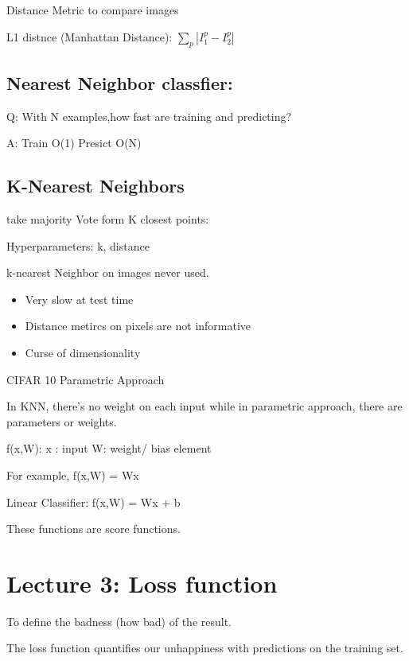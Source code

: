 \documentclass[11pt]{article}
\begin{document}
Distance Metric to compare images

L1 distnce (Manhattan Distance): \(\sum_p |I_1^p-I_2^p|\) 

\subsection{Nearest Neighbor classfier:}
\label{sec:org224f01a}

Q: With N examples,how fast are training and predicting? 

A: Train O(1)
   Presict O(N)
\subsection{K-Nearest Neighbors}
\label{sec:org2050975}

take majority Vote form K closest points:

Hyperparameters: k, distance

k-nearest Neighbor on images never used.

\begin{itemize}
\item Very slow at test time

\item Distance metircs on pixels are not informative

\item Curse of dimensionality
\end{itemize}

CIFAR 10 Parametric Approach

In KNN, there's no weight on each input while in parametric approach, there are parameters or weights.

f(x,W): x : input W: weight/ bias element

For example, f(x,W) = Wx

Linear Classifier: f(x,W) = Wx + b

These functions are score functions.
\section{Lecture 3: Loss function}
\label{sec:org64aa6c0}

To define the badness (how bad) of the result.

The loss function quantifies our unhappiness with predictions on the training
set.
\end{document}
